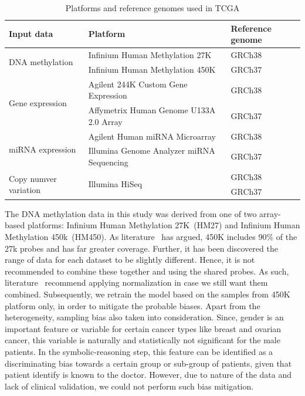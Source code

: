 \begin{table}
    \centering
    \scriptsize
    \caption{Platforms and reference genomes used in TCGA}
    \label{tab:platforms}
    \vspace{-2mm}
    \begin{tabular}{l|l|l} 
        \hline
        \textbf{Input data} & \textbf{Platform} & \textbf{Reference genome}  \\ 
        \hline
        \multirow{2}{*}{DNA methylation}  & Infinium Human Methylation 27K & GRCh38  \\ 
        \cline{2-3}
                                               & Infinium Human Methylation 450K & GRCh37 \\ 
        \hline
        \multirow{2}{*}{Gene expression}       & Agilent 244K Custom Gene Expression & GRCh38 \\ 
        \cline{2-3}
                                               & Affymetrix Human Genome U133A 2.0 Array & GRCh37 \\ 
        \hline
        \multirow{2}{*}{miRNA expression}      & Agilent Human miRNA Microarray & GRCh38 \\ 
        \cline{2-3}
                                               & Illumina Genome Analyzer miRNA Sequencing & GRCh37  \\ 
        \hline
        \multirow{2}{*}{Copy numver variation} & \multirow{2}{*}{Illumina HiSeq}           & GRCh38  \\
                                               &                                           & GRCh37 \\ 
        \hline
    \end{tabular}
    \vspace{-2mm}
\end{table}

\hspace*{3.5mm} The DNA methylation data in this study was derived from one of two array-based platforms: Infinium Human Methylation 27K~(HM27) and Infinium Human Methylation 450k~(HM450). As literature~\cite{pidsley2013data} has argued, 450K includes 90\% of the 27k probes and has far greater coverage. Further, it has been discovered the range of data for each dataset to be slightly different. Hence, it is not recommended to combine these together and using the shared probes. As such, literature~\cite{pidsley2013data} recommend applying normalization in case we still want them combined. Subsequently, we retrain the model based on the samples from 450K platform only, in order to mitigate the probable biases. 
Apart from the heterogeneity, sampling bias also taken into consideration. Since, gender is an important feature or variable for certain cancer types like breast and ovarian cancer, this variable is naturally and statistically not significant for the male patients. In the symbolic-reasoning step, this feature can be identified as a discriminating bias towards a certain group or sub-group of patients, given that patient identify is known to the doctor. However, due to nature of the data and lack of clinical validation, we could not perform such bias mitigation. 

